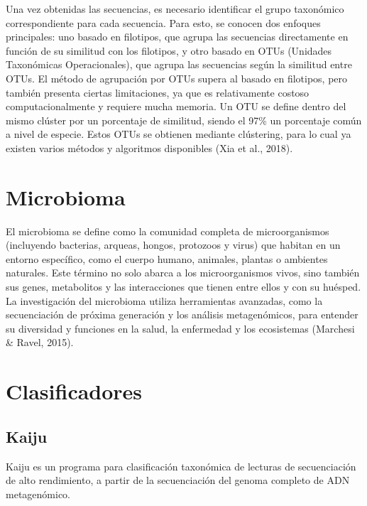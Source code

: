 Una vez obtenidas las secuencias, es necesario identificar el grupo taxonómico correspondiente para cada secuencia. Para esto, se conocen dos enfoques principales: uno basado en filotipos, que agrupa las secuencias directamente en función de su similitud con los filotipos, y otro basado en OTUs (Unidades Taxonómicas Operacionales), que agrupa las secuencias según la similitud entre OTUs. El método de agrupación por OTUs supera al basado en filotipos, pero también presenta ciertas limitaciones, ya que es relativamente costoso computacionalmente y requiere mucha memoria. Un OTU se define dentro del mismo clúster por un porcentaje de similitud, siendo el 97\% un porcentaje común a nivel de especie. Estos OTUs se obtienen mediante clústering, para lo cual ya existen varios métodos y algoritmos disponibles (Xia et al., 2018).\\

\section{Microbioma}
El microbioma se define como la comunidad completa de microorganismos (incluyendo bacterias, arqueas, hongos, protozoos y virus) que habitan en un entorno específico, como el cuerpo humano, animales, plantas o ambientes naturales. Este término no solo abarca a los microorganismos vivos, sino también sus genes, metabolitos y las interacciones que tienen entre ellos y con su huésped. La investigación del microbioma utiliza herramientas avanzadas, como la secuenciación de próxima generación y los análisis metagenómicos, para entender su diversidad y funciones en la salud, la enfermedad y los ecosistemas (Marchesi \& Ravel, 2015).\\

\section{Clasificadores}

\subsection{Kaiju}
Kaiju es un programa para clasificación taxonómica de lecturas de secuenciación de alto rendimiento,  a partir de la secuenciación del genoma completo de ADN metagenómico. \\

